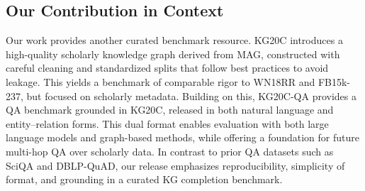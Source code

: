 \documentclass[conference]{IEEEtran}
\begin{document}
\subsection{Our Contribution in Context}
Our work provides another curated benchmark resource. KG20C introduces a high-quality scholarly knowledge graph derived from MAG, constructed with careful cleaning and standardized splits that follow best practices to avoid leakage. This yields a benchmark of comparable rigor to WN18RR and FB15k-237, but focused on scholarly metadata. Building on this, KG20C-QA provides a QA benchmark grounded in KG20C, released in both natural language and entity--relation forms. This dual format enables evaluation with both large language models and graph-based methods, while offering a foundation for future multi-hop QA over scholarly data. In contrast to prior QA datasets such as SciQA and DBLP-QuAD, our release emphasizes reproducibility, simplicity of format, and grounding in a curated KG completion benchmark.
\end{document}
